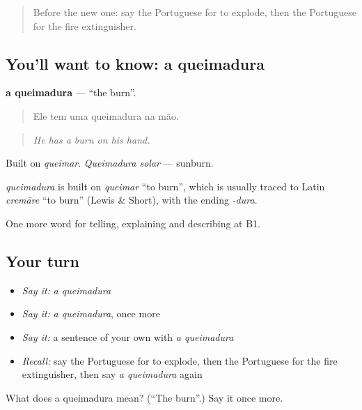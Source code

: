 \label{lesson:PT-C301-queimadura}



\begin{quote}
Before the new one: say the Portuguese for to explode, then the Portuguese for the fire extinguisher.
\end{quote}

\subsection*{You'll want to know: a queimadura}
\textbf{a queimadura} — \textquotedblleft{}the burn\textquotedblright{}.

\begin{quote}
Ele tem uma queimadura na mão.
\end{quote}

\begin{quote}
\emph{He has a burn on his hand.}
\end{quote}

Built on \emph{queimar}. \emph{Queimadura solar} — sunburn.

\begin{cousinweb}
\emph{queimadura} is built on \emph{queimar} \textquotedblleft{}to burn\textquotedblright{}, which is usually traced to Latin \emph{cremāre} \textquotedblleft{}to burn\textquotedblright{} (Lewis \& Short), with the ending \emph{-dura}.
\end{cousinweb}

\begin{grammarlens}[title={What you've built}]
One more word for telling, explaining and describing at B1.
\end{grammarlens}

\subsection*{Your turn}
\begin{itemize}
\raggedright
  \item \emph{Say it:} \emph{a queimadura}
  \item \emph{Say it:} \emph{a queimadura}, once more
  \item \emph{Say it:} a sentence of your own with \emph{a queimadura}
  \item \emph{Recall:} say the Portuguese for to explode, then the Portuguese for the fire extinguisher, then say \emph{a queimadura} again
\end{itemize}

\begin{tcolorbox}[breakable,colback=teal!4,colframe=teal!35!black,title={Before you move on}]
What does a queimadura mean? (\textquotedblleft{}The burn\textquotedblright{}.) Say it once more.
\end{tcolorbox}
